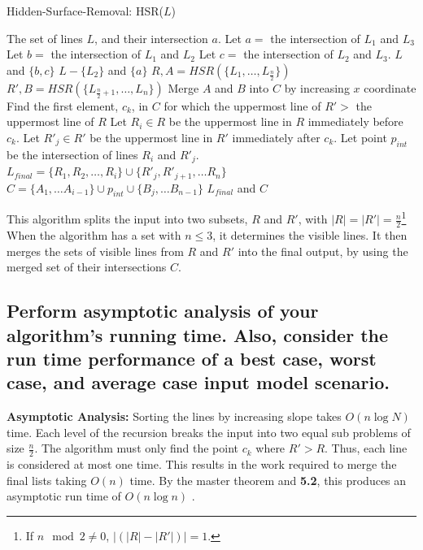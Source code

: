 \documentclass{article}
\begin{document}
\begin{algorithm}
\caption{Hidden-Surface-Removal:  HSR($L$)}
\begin{algorithmic}
	\State \Return The set of lines $L$, and their intersection $a$.
	\State Let $a =$ the intersection of $L_1$ and $L_3$
	\State Let $b =$ the intersection of $L_1$ and $L_2$
		\State Let $c =$ the intersection of $L_2$ and $L_3$.
		\State \Return $L$ and $\{b, c\}$
	\Else 
		\State \Return $L - \{L_2\}$ and $\{a\}$
	\EndIf
\Else
	\State $R, A = HSR(\{L_1, \dots , L_{\frac{n}{2}}\})$
	\State $R', B = HSR(\{L_{\frac{n}{2}+1}, \dots , L_n\})$
\EndIf
\State Merge $A$ and $B$ into $C$ by increasing $x$ coordinate
\State Find the first element, $c_k$, in $C$ for which the uppermost line of $R' > $ the uppermost line of $R$
\State Let $R_i \in R$ be the uppermost line in $R$ immediately before $c_k$.
\State Let $R'_j \in R'$ be the uppermost line in $R'$ immediately after $c_k$.
\State Let point $p_{int}$ be the intersection of lines $R_i$ and $R'_j$.
\State $L_{final} = \{R_1, R_2, \dots, R_i\} \cup \{R'_j, R'_{j+1}, \dots R_n \}$
\State $C = \{A_1, \dots A_{i-1} \} \cup p_{int} \cup \{B_j, \dots B_{n-1} \}$
\State \Return $L_{final}$ and $C$
\end{algorithmic}
\end{algorithm}

\noindent This algorithm splits the input into two subsets, $R$ and $R'$, with $|R|=|R'|=\frac{n}{2}$\footnote{If $n \mod 2 \neq 0$, $|(|R| - |R'|)| = 1$.}
When the algorithm has a set with $n \leq 3$, it determines the visible lines.  It then merges the sets of visible lines from $R$ and $R'$ into the final output, by using the merged set of their intersections $C$. 

\subsection{Perform asymptotic analysis of your algorithm's running time.  Also, consider the run time performance of a best case, worst case, and average case input model scenario.}

\noindent \textbf{Asymptotic Analysis:} \newline
Sorting the lines by increasing slope takes $O(n \log{N})$ time.
Each level of the recursion breaks the input into two equal sub problems of size $\frac{n}{2}$.
The algorithm must only find the point $c_k$ where $R' > R$.  Thus, each line is considered at most one time.  
This results in the work required to merge the final lists taking $O(n)$ time.
By the master theorem and \textbf{5.2}, this produces an asymptotic run time of $O(n \log{n})$ \cite{algDesign}.
\end{document}
